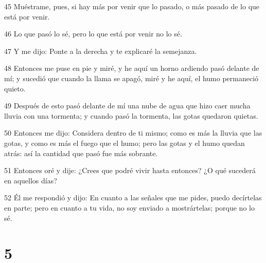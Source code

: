 \par 45 Muéstrame, pues, si hay más por venir que lo pasado, o más pasado de lo que está por venir.
\par 46 Lo que pasó lo sé, pero lo que está por venir no lo sé.
\par 47 Y me dijo: Ponte a la derecha y te explicaré la semejanza.
\par 48 Entonces me puse en pie y miré, y he aquí un horno ardiendo pasó delante de mí; y sucedió que cuando la llama se apagó, miré y he aquí, el humo permaneció quieto.
\par 49 Después de esto pasó delante de mí una nube de agua que hizo caer mucha lluvia con una tormenta; y cuando pasó la tormenta, las gotas quedaron quietas.
\par 50 Entonces me dijo: Considera dentro de ti mismo; como es más la lluvia que las gotas, y como es más el fuego que el humo; pero las gotas y el humo quedan atrás: así la cantidad que pasó fue más sobrante.
\par 51 Entonces oré y dije: ¿Crees que podré vivir hasta entonces? ¿O qué sucederá en aquellos días?
\par 52 Él me respondió y dijo: En cuanto a las señales que me pides, puedo decírtelas en parte; pero en cuanto a tu vida, no soy enviado a mostrártelas; porque no lo sé.

\chapter{5}


